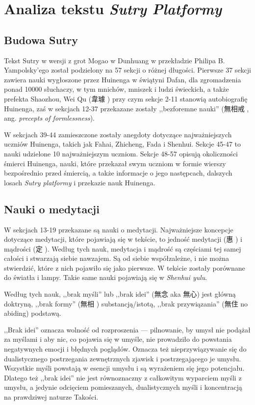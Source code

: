 \chapter{Analiza tekstu \textit{Sutry Platformy}}

\section{Budowa Sutry}
Tekst Sutry w wersji z grot Mogao w Dunhuang w przekładzie Philipa B. Yampolsky'ego został podzielony na 57 sekcji o różnej długości. Pierwsze 37 sekcji zawiera nauki wygłoszone przez Huinenga w świątyni Dafan, dla zgromadzenia ponad 10000 słuchaczy, w tym mnichów, mniszek i ludzi świeckich, a także prefekta Shaozhou, Wei Qu (韋璩 ) przy czym sekcje 2-11 stanowią autobiografię Huinenga, zaś w sekcjach 12-37 przekazane zostały ,,bezforemne nauki'' (無相戒 , ang. \textit{precepts of formlessness}).

W sekcjach 39-44 zamieszczone zostały anegdoty dotyczące najważniejszych uczniów Huinenga, takich jak Fahai, Zhicheng, Fada i Shenhui. Sekcje 45-47 to nauki udzielone 10 najważniejszym uczniom. Sekcje 48-57 opisują okoliczności śmierci Huinenga, nauki, które przekazał swym uczniom w formie wierszy bezpośrednio przed śmiercią, a także informacje o jego następcach, dalszych losach \textit{Sutry platformy} i przekazie nauk Huinenga.

\section{Nauki o medytacji}
W sekcjach 13-19 przekazane są nauki o medytacji. Najważniejsze koncepcje dotyczące medytacji, które pojawiają się w tekście, to jedność medytacji (惠 ) i mądrości (定 ). Według tych nauk, medytacja i mądrość są częściami tej samej całości i stwarzają siebie nawzajem. Są od siebie współzależne, i nie można stwierdzić, które z nich pojawiło się jako pierwsze. W tekście zostały porównane do światła i lampy. Takie same nauki pojawiają się w \textit{Shenhui yulu}.

Według tych nauk, ,,brak myśli'' lub ,,brak idei'' (無念 aka 無心) jest główną doktryną, ,,brak formy'' (無相 ) substancją/istotą, ,,brak przywiązania'' (無住 no abiding) podstawą.

,,Brak idei'' oznacza wolność od rozproszenia --- pilnowanie, by umysł nie podążał za myślami i aby nic, co pojawia się w umyśle, nie prowadziło do powstania negatywnych emocji i błędnych poglądów. Oznacza też nieprzywiązywanie się do dualistycznego postrzegania zewnętrznych zjawisk i postrzegającego je umysłu. Wszystkie myśli powstają w esencji umysłu i są wyrażeniem się jego potencjału. Dlatego też ,,brak idei'' nie jest równoznaczny z całkowitym wyparciem myśli z umysłu, a jedynie odcięciem pomieszanych, dualistycznych myśli i koncentracją na prawdziwej naturze Takości.

